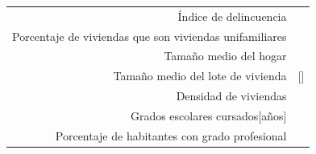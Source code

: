 \documentclass[12pt,]{book}
\begin{document}
\begin{longtable}[]{@{}rr@{}}
\begin{minipage}[t]{0.57\columnwidth}\raggedleft\strut
Índice de delincuencia\strut
\end{minipage} & \begin{minipage}[t]{0.31\columnwidth}\raggedleft\strut
\citep{troy_predicting_2007}\strut
\end{minipage}\tabularnewline
\begin{minipage}[t]{0.57\columnwidth}\raggedleft\strut
Porcentaje de viviendas que son viviendas unifamiliares\strut
\end{minipage} & \begin{minipage}[t]{0.31\columnwidth}\raggedleft\strut
\citep{troy_predicting_2007}\strut
\end{minipage}\tabularnewline
\begin{minipage}[t]{0.57\columnwidth}\raggedleft\strut
Tamaño medio del hogar\strut
\end{minipage} & \begin{minipage}[t]{0.31\columnwidth}\raggedleft\strut
\citep{landry_street_2009}\strut
\end{minipage}\tabularnewline
\begin{minipage}[t]{0.57\columnwidth}\raggedleft\strut
Tamaño medio del lote de vivienda\strut
\end{minipage} & \begin{minipage}[t]{0.31\columnwidth}\raggedleft\strut
{[}\citet{shanahan_socio-economic_2014}{]}\strut
\end{minipage}\tabularnewline
\begin{minipage}[t]{0.57\columnwidth}\raggedleft\strut
Densidad de viviendas\strut
\end{minipage} & \begin{minipage}[t]{0.31\columnwidth}\raggedleft\strut
\strut
\end{minipage}\tabularnewline
\begin{minipage}[t]{0.57\columnwidth}\raggedleft\strut
Grados escolares cursados{[}años{]}\strut
\end{minipage} & \begin{minipage}[t]{0.31\columnwidth}\raggedleft\strut
\strut
\end{minipage}\tabularnewline
\begin{minipage}[t]{0.57\columnwidth}\raggedleft\strut
Porcentaje de habitantes con grado profesional\strut
\end{minipage} & \begin{minipage}[t]{0.31\columnwidth}\raggedleft\strut
\citep{nesbitt_exploring_2016}\strut

\end{minipage}
\end{longtable}
\end{document}
